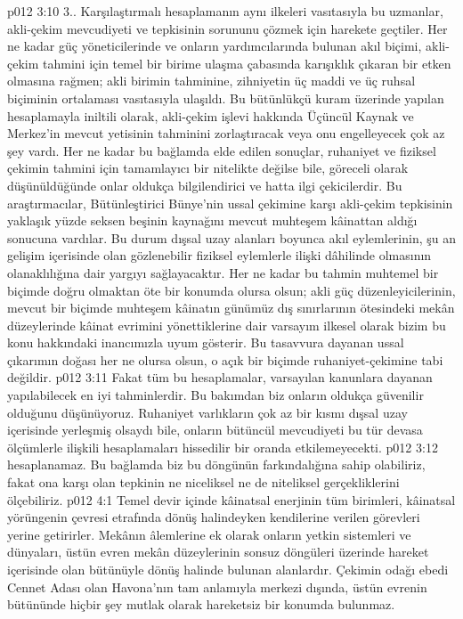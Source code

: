 \vs p012 3:10 3.. Karşılaştırmalı hesaplamanın aynı ilkeleri vasıtasıyla bu uzmanlar, akli\hyp{}çekim mevcudiyeti ve tepkisinin sorununu çözmek için harekete geçtiler. Her ne kadar güç yöneticilerinde ve onların yardımcılarında bulunan akıl biçimi, akli\hyp{}çekim tahmini için temel bir birime ulaşma çabasında karışıklık çıkaran bir etken olmasına rağmen; akli birimin tahminine, zihniyetin üç maddi ve üç ruhsal biçiminin ortalaması vasıtasıyla ulaşıldı. Bu bütünlükçü kuram üzerinde yapılan hesaplamayla iniltili olarak, akli\hyp{}çekim işlevi hakkında Üçüncül Kaynak ve Merkez’in mevcut yetisinin tahminini zorlaştıracak veya onu engelleyecek çok az şey vardı. Her ne kadar bu bağlamda elde edilen sonuçlar, ruhaniyet ve fiziksel çekimin tahmini için tamamlayıcı bir nitelikte değilse bile, göreceli olarak düşünüldüğünde onlar oldukça bilgilendirici ve hatta ilgi çekicilerdir. Bu araştırmacılar, Bütünleştirici Bünye’nin ussal çekimine karşı akli\hyp{}çekim tepkisinin yaklaşık yüzde seksen beşinin kaynağını mevcut muhteşem kâinattan aldığı sonucuna vardılar. Bu durum dışsal uzay alanları boyunca akıl eylemlerinin, şu an gelişim içerisinde olan gözlenebilir fiziksel eylemlerle ilişki dâhilinde olmasının olanaklılığına dair yargıyı sağlayacaktır. Her ne kadar bu tahmin muhtemel bir biçimde doğru olmaktan öte bir konumda olursa olsun; akli güç düzenleyicilerinin, mevcut bir biçimde muhteşem kâinatın günümüz dış sınırlarının ötesindeki mekân düzeylerinde kâinat evrimini yönettiklerine dair varsayım ilkesel olarak bizim bu konu hakkındaki inancımızla uyum gösterir. Bu tasavvura dayanan ussal çıkarımın doğası her ne olursa olsun, o açık bir biçimde ruhaniyet\hyp{}çekimine tabi değildir.
\vs p012 3:11 Fakat tüm bu hesaplamalar, varsayılan kanunlara dayanan yapılabilecek en iyi tahminlerdir. Bu bakımdan biz onların oldukça güvenilir olduğunu düşünüyoruz. Ruhaniyet varlıkların çok az bir kısmı dışsal uzay içerisinde yerleşmiş olsaydı bile, onların bütüncül mevcudiyeti bu tür devasa ölçümlerle ilişkili hesaplamaları hissedilir bir oranda etkilemeyecekti.
\vs p012 3:12  hesaplanamaz. Bu bağlamda biz bu döngünün farkındalığına sahip olabiliriz, fakat ona karşı olan tepkinin ne niceliksel ne de niteliksel gerçekliklerini ölçebiliriz.
\vs p012 4:1 Temel devir içinde kâinatsal enerjinin tüm birimleri, kâinatsal yörüngenin çevresi etrafında dönüş halindeyken kendilerine verilen görevleri yerine getirirler. Mekânın âlemlerine ek olarak onların yetkin sistemleri ve dünyaları, üstün evren mekân düzeylerinin sonsuz döngüleri üzerinde hareket içerisinde olan bütünüyle dönüş halinde bulunan alanlardır. Çekimin odağı ebedi Cennet Adası olan Havona’nın tam anlamıyla merkezi dışında, üstün evrenin bütününde hiçbir şey mutlak olarak hareketsiz bir konumda bulunmaz.
